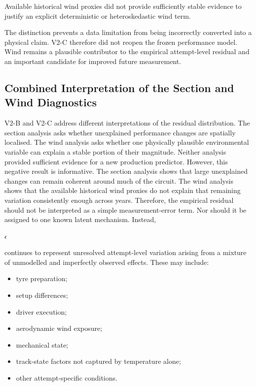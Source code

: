 Available historical wind proxies did not provide sufficiently stable evidence to justify an explicit deterministic or heteroskedastic wind term.

The distinction prevents a data limitation from being incorrectly converted into a physical claim. V2-C therefore did not reopen the frozen performance model. Wind remains a plausible contributor to the empirical attempt-level residual and an important candidate for improved future measurement.

\subsection{Combined Interpretation of the Section and Wind Diagnostics}
V2-B and V2-C address different interpretations of the residual distribution. The section analysis asks whether unexplained performance changes are spatially localised. The wind analysis asks whether one physically plausible environmental variable can explain a stable portion of their magnitude. Neither analysis provided sufficient evidence for a new production predictor. However, this negative result is informative. The section analysis shows that large unexplained changes can remain coherent around much of the circuit. The wind analysis shows that the available historical wind proxies do not explain that remaining variation consistently enough across years. Therefore, the empirical residual should not be interpreted as a simple measurement-error term. Nor should it be assigned to one known latent mechanism. Instead,

\begin{center}\textit{\ensuremath{\epsilon}}\end{center}

continues to represent unresolved attempt-level variation arising from a mixture of unmodelled and imperfectly observed effects. These may include:

\begin{itemize}
\item tyre preparation;
\item setup differences;
\item driver execution;
\item aerodynamic wind exposure;
\item mechanical state;
\item track-state factors not captured by temperature alone;
\item other attempt-specific conditions.
\end{itemize}

